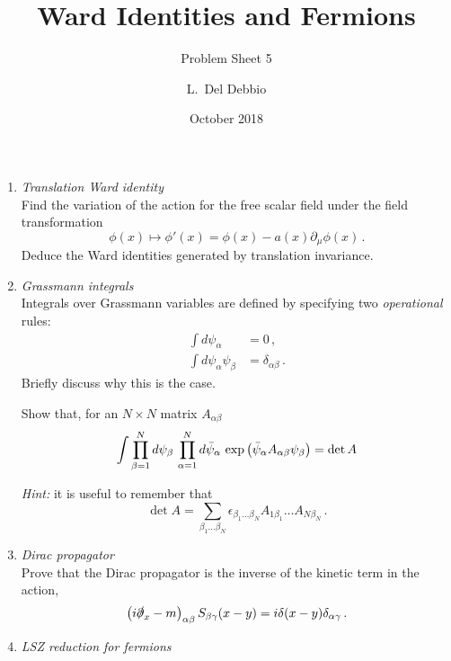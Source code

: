 \documentclass{tutorial}
\subtitle{Problem Sheet 5}
\title{Ward Identities and Fermions}
\author{L.~Del Debbio}
\date{October 2018}
\begin{document}
\maketitle

\begin{enumerate}
  \item \emph{ Translation Ward identity} \\
    
    Find the variation of the action for the free scalar field under
    the field transformation
    \[
    \phi(x) \mapsto \phi'(x) = \phi(x) - a(x) \partial_\mu \phi(x)\, .
    \]
    Deduce the Ward identities generated by translation invariance. 

    \bigskip
    
  \item \emph{ Grassmann integrals}\\

    Integrals over Grassmann variables are defined by specifying two
    \emph{operational} rules:
    \begin{align}
      \int d\psi_\alpha &= 0\, , \nonumber \\
      \int d\psi_\alpha \psi_\beta &= \delta_{\alpha\beta}\, . \nonumber
    \end{align}
    Briefly discuss why this is the case.

    Show that, for an $N\times N$ matrix $A_{\alpha\beta}$ 
    \[
    \int \prod_{\beta=1}^N d\psi_\beta\,
    \prod_{\alpha=1}^N d\bar{\psi}_\alpha\,
    \exp\left(
      \bar{\psi}_\alpha A_{\alpha\beta} \psi_\beta
      \right) = \det A
    \]
    
    \emph{Hint:} it is useful to remember that 
    \[
    \det A = \sum_{\beta_1\ldots \beta_N} 
    \epsilon_{\beta_1\ldots\beta_N} 
    A_{1\beta_1} \ldots A_{N\beta_N}\, .
    \]

    \bigskip

    \item \emph{ Dirac propagator} \\
      
      Prove that the Dirac propagator is the inverse of the kinetic
      term in the action, \ie
      \[
      \left(i \slashed{\partial}_x -m \right)_{\alpha\beta}
      S_{\beta\gamma}(x-y) = i \delta(x-y) \delta_{\alpha\gamma}\, .
      \]

  \item \emph{ LSZ reduction for fermions}\\
    

\end{enumerate}
\end{document}
